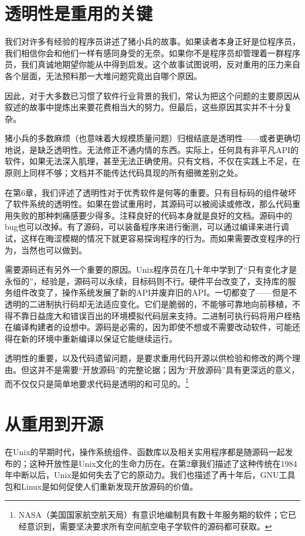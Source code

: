 \documentclass[12pt,oneside]{book}
\begin{document}
\begin{common-format}
\section{透明性是重用的关键}
我们对许多有经验的程序员讲述了猪小兵的故事。如果读者本身正好是位程序员，我们相信你会和他们一样有感同身受的无奈。如果你不是程序员却管理着一群程序员，我们真诚地期望你能从中得到启发。这个故事试图说明，反对重用的压力来自各个层面，无法预料那一大堆问题究竟出自哪个原因。

因此，对于大多数已习惯了软件行业背景的我们，常认为把这个问题的主要原因从叙述的故事中提炼出来要花费相当大的努力。但最后，这些原因其实并不十分复杂。

猪小兵的多数麻烦（也意味着大规模质量问题）归根结底是透明性——或者更确切地说，是缺乏透明性。无法修正不通内情的东西。实际上，任何具有非平凡API的软件，如果无法深入肌理，甚至无法正确使用。只有文档，不仅在实践上不足，在原则上同样不够；文档并不能传达代码具现的所有细微差别之处。

在第6章，我们评述了透明性对于优秀软件是何等的重要。只有目标码的组件破坏了软件系统的透明性。如果在尝试重用时，其源码可以被阅读或修改，那么代码重用失败的那种刺痛感要少得多。注释良好的代码本身就是良好的文档。源码中的bug也可以改掉。有了源码，可以装备程序来进行衡测，可以通过编译来进行调试，这样在晦涩模糊的情况下就更容易探询程序的行为。而如果需要改变程序的行为，当然也可以做到。

需要源码还有另外一个重要的原因。Unix程序员在几十年中学到了“只有变化才是永恒的”，经验是，源码可以永续，目标码则不行。硬件平台改变了，支持库的服务组件改变了，操作系统发展了新的API并废弃旧的API。一切都变了——但是不透明的二进制执行码却无法适应变化。它们是脆弱的，不能够可靠地向前移植，不得不靠日益庞大和错误百出的环境模拟代码层来支持。二进制可执行码将用户桎梏在编译构建者的设想中。源码是必需的，因为即使不想或不需要改动软件，可能还得在新的环境中重新编译以保证它能继续运行。

透明性的重要，以及代码遗留问题，是要求重用代码开源以供检验和修改的两个理由。但这并不是需要“开放源码”的完整论据；因为“开放源码”具有更深远的意义，而不仅仅只是简单地要求代码是透明的和可见的。\footnote{NASA（美国国家航空航天局）有意识地编制具有数十年服务期的软件；它已经意识到，需要坚决要求所有空间航空电子学软件的源码都可获取。}


\section{从重用到开源}
在Unix的早期时代，操作系统组件、函数库以及相关实用程序都是随源码一起发布的；这种开放性是Unix文化的生命力历在。在第2章我们描述了这种传统在1984年中断以后，Unix是如何失去了它的原动力。我们也描述了再十年后，GNU工具包和Linux是如何促使人们重新发现开放源码的价值。


\end{common-format}
\end{document}

